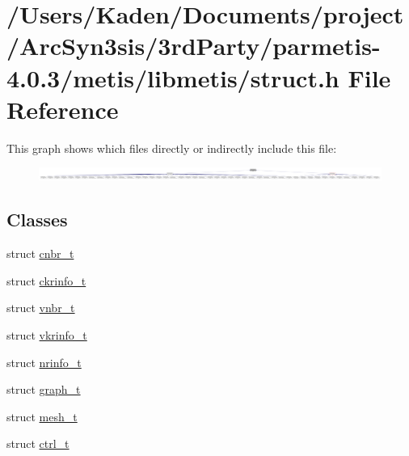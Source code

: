 \hypertarget{a00972}{}\section{/\+Users/\+Kaden/\+Documents/project/\+Arc\+Syn3sis/3rd\+Party/parmetis-\/4.0.3/metis/libmetis/struct.h File Reference}
\label{a00972}
This graph shows which files directly or indirectly include this file\+:\nopagebreak
\begin{figure}[H]
\begin{center}
\leavevmode
\includegraphics[width=350pt]{a00974}
\end{center}
\end{figure}
\subsection*{Classes}
\begin{DoxyCompactItemize}
\item 
struct \hyperlink{a00714}{cnbr\+\_\+t}
\item 
struct \hyperlink{a00718}{ckrinfo\+\_\+t}
\item 
struct \hyperlink{a00722}{vnbr\+\_\+t}
\item 
struct \hyperlink{a00726}{vkrinfo\+\_\+t}
\item 
struct \hyperlink{a00730}{nrinfo\+\_\+t}
\item 
struct \hyperlink{a00734}{graph\+\_\+t}
\item 
struct \hyperlink{a00738}{mesh\+\_\+t}
\item 
struct \hyperlink{a00742}{ctrl\+\_\+t}
\end{DoxyCompactItemize}
